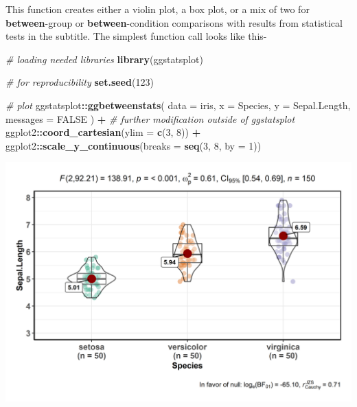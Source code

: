 \documentclass[]{article}
\newenvironment{Shaded}{\begin{snugshade}}{\end{snugshade}}
\newcommand{\CommentTok}[1]{\textcolor[rgb]{0.56,0.35,0.01}{\textit{#1}}}
\newcommand{\DataTypeTok}[1]{\textcolor[rgb]{0.13,0.29,0.53}{#1}}
\newcommand{\DecValTok}[1]{\textcolor[rgb]{0.00,0.00,0.81}{#1}}
\newcommand{\KeywordTok}[1]{\textcolor[rgb]{0.13,0.29,0.53}{\textbf{#1}}}
\newcommand{\NormalTok}[1]{#1}
\newcommand{\OperatorTok}[1]{\textcolor[rgb]{0.81,0.36,0.00}{\textbf{#1}}}
\newcommand{\OtherTok}[1]{\textcolor[rgb]{0.56,0.35,0.01}{#1}}
\newcommand{\StringTok}[1]{\textcolor[rgb]{0.31,0.60,0.02}{#1}}
\begin{document}
This function creates either a violin plot, a box plot, or a mix of two
for \textbf{between}-group or \textbf{between}-condition comparisons
with results from statistical tests in the subtitle. The simplest
function call looks like this-

\begin{Shaded}
\begin{Highlighting}[]
\CommentTok{# loading needed libraries}
\KeywordTok{library}\NormalTok{(ggstatsplot)}

\CommentTok{# for reproducibility}
\KeywordTok{set.seed}\NormalTok{(}\DecValTok{123}\NormalTok{)}

\CommentTok{# plot}
\NormalTok{ggstatsplot}\OperatorTok{::}\KeywordTok{ggbetweenstats}\NormalTok{(}
  \DataTypeTok{data =}\NormalTok{ iris,}
  \DataTypeTok{x =}\NormalTok{ Species,}
  \DataTypeTok{y =}\NormalTok{ Sepal.Length,}
  \DataTypeTok{messages =} \OtherTok{FALSE}
\NormalTok{) }\OperatorTok{+}\StringTok{ }\CommentTok{# further modification outside of ggstatsplot}
\StringTok{  }\NormalTok{ggplot2}\OperatorTok{::}\KeywordTok{coord_cartesian}\NormalTok{(}\DataTypeTok{ylim =} \KeywordTok{c}\NormalTok{(}\DecValTok{3}\NormalTok{, }\DecValTok{8}\NormalTok{)) }\OperatorTok{+}
\StringTok{  }\NormalTok{ggplot2}\OperatorTok{::}\KeywordTok{scale_y_continuous}\NormalTok{(}\DataTypeTok{breaks =} \KeywordTok{seq}\NormalTok{(}\DecValTok{3}\NormalTok{, }\DecValTok{8}\NormalTok{, }\DataTypeTok{by =} \DecValTok{1}\NormalTok{))}
\end{Highlighting}
\end{Shaded}

\includegraphics[width=1\linewidth]{./figures/paper-ggbetweenstats1-1}
\end{document}
